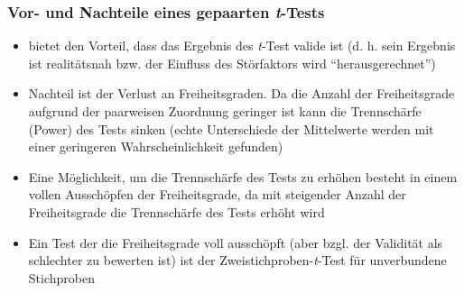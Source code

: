 \documentclass{beamer}
\begin{document}
\begin{frame}
\frametitle{Vor- und Nachteile eines gepaarten \textit{t}-Tests}
\begin{itemize}
\item bietet den Vorteil, dass das Ergebnis des \textit{t}-Test valide ist (d. h. sein Ergebnis ist realitätsnah bzw. der Einfluss des Störfaktors wird "`herausgerechnet"')
\item Nachteil ist der Verlust an Freiheitsgraden. Da die Anzahl der Freiheitsgrade aufgrund der paarweisen Zuordnung geringer ist kann die Trennschärfe (Power) des Tests sinken (echte Unterschiede der Mittelwerte werden mit einer geringeren Wahrscheinlichkeit gefunden)
\item Eine Möglichkeit, um die Trennschärfe des Tests zu erhöhen besteht in einem vollen Ausschöpfen der Freiheitsgrade, da mit steigender Anzahl der Freiheitsgrade die Trennschärfe des Tests erhöht wird
\item Ein Test der die Freiheitsgrade voll ausschöpft (aber bzgl. der Validität als schlechter zu bewerten ist) ist der Zweistichproben-\textit{t}-Test für unverbundene Stichproben
\end{itemize}


\end{frame}
\end{document}
